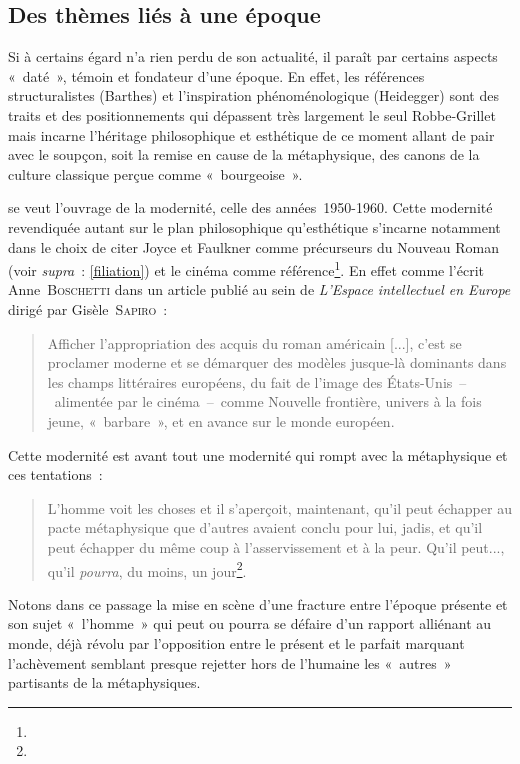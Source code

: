 \documentclass[12pt, a4paper]{article}
\begin{document}
\subsection{Des thèmes liés à une époque}

Si à certains égard \punr{} n'a rien perdu de son actualité, il paraît par certains aspects «~daté~», témoin et fondateur d'une époque. En effet, les références structuralistes (Barthes) et l'inspiration phénoménologique (Heidegger) sont des traits et des positionnements qui dépassent très largement le seul Robbe-Grillet mais incarne l'héritage philosophique et esthétique de ce moment allant de pair avec le soupçon, soit la remise en cause de la métaphysique, des canons de la culture classique perçue comme «~bourgeoise~». %

\punr{} se veut l'ouvrage de la modernité, celle des années~1950-1960. Cette modernité revendiquée autant sur le plan philosophique qu'esthétique s'incarne notamment dans le choix de citer Joyce et Faulkner comme précurseurs du Nouveau Roman (voir \textit{supra}~: \ref{filiation}) et le cinéma comme référence\footnote{}. En effet comme l'écrit Anne~\textsc{Boschetti} dans un article publié au sein de \textit{L'Espace intellectuel en Europe} dirigé par Gisèle~\textsc{Sapiro}~:
\begin{quote}
    Afficher l’appropriation des acquis du roman américain [...], c’est se proclamer moderne et se démarquer des modèles jusque-là dominants dans les champs littéraires européens, du fait de l’image des États-Unis~–~alimentée par le cinéma~–~comme Nouvelle frontière, univers à la fois jeune, «~barbare~», et en avance sur le monde européen\inte.
\end{quote}
Cette modernité est avant tout une modernité qui rompt avec la métaphysique et ces tentations~:
\begin{quote}
    L’homme voit les choses et il s’aperçoit, maintenant, qu’il peut échapper au pacte métaphysique que d’autres avaient conclu pour lui, jadis, et qu’il peut échapper du même coup à l’asservissement et à la peur. Qu’il peut..., qu’il \textit{pourra}, du moins, un jour\footnote{}.
\end{quote}
Notons dans ce passage la mise en scène d'une fracture entre l'époque présente et son sujet «~l'homme~» qui peut ou pourra se défaire d'un rapport alliénant au monde, déjà révolu par l'opposition entre le présent et le parfait marquant l'achèvement semblant presque rejetter hors de l'humaine les «~autres~» partisants de la métaphysiques.
\end{document}
